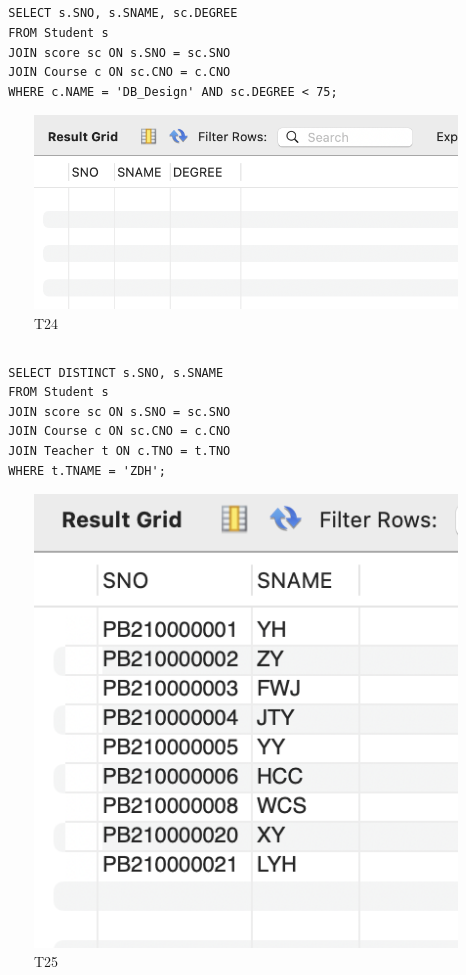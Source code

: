 \documentclass[UTF8]{ctexart}
\begin{document}
\subsection{}
\begin{lstlisting}
  SELECT s.SNO, s.SNAME, sc.DEGREE
  FROM Student s
  JOIN score sc ON s.SNO = sc.SNO
  JOIN Course c ON sc.CNO = c.CNO
  WHERE c.NAME = 'DB_Design' AND sc.DEGREE < 75;
\end{lstlisting}
\begin{figure}[H]
  \centering
  \includegraphics[scale=0.7]{pics/24.png}
  \caption*{T24}
\end{figure}

\subsection{}
\begin{lstlisting}
  SELECT DISTINCT s.SNO, s.SNAME
  FROM Student s
  JOIN score sc ON s.SNO = sc.SNO
  JOIN Course c ON sc.CNO = c.CNO
  JOIN Teacher t ON c.TNO = t.TNO
  WHERE t.TNAME = 'ZDH';
\end{lstlisting}
\begin{figure}[H]
  \centering
  \includegraphics[scale=0.7]{pics/25.png}
  \caption*{T25}
\end{figure}
\end{document}
